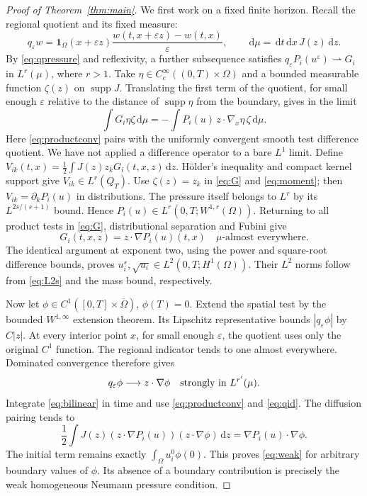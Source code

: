 \documentclass[11pt]{article}
\newcommand{\eps}{\varepsilon}
\newcommand{\dd}{\,\mathrm d}
\newcommand{\Om}{\Omega}
\newcommand{\qe}{q_\eps}
\DeclareMathOperator{\supp}{supp}
\begin{document}
\begin{proof}[Proof of Theorem~\ref{thm:main}]
We first work on a fixed finite horizon. Recall the regional quotient and its
fixed measure:
\[
 \qe w=\mathbf1_\Om(x+\eps z)
       \frac{w(t,x+\eps z)-w(t,x)}{\eps},\qquad
 \dd\mu=\dd t\dd x\,J(z)\dd z.
\]
By \eqref{eq:qpressure} and reflexivity, a further subsequence satisfies
$\qe P_i(u^\eps)\rightharpoonup G_i$ in $L^r(\mu)$, where $r>1$.
Take $\eta\in C_c^\infty((0,T)\times\Om)$ and a bounded measurable
function $\zeta(z)$ on $\supp J$. Translating the first term of the
quotient, for small enough $\eps$ relative to the distance of $\supp\eta$
from the boundary, gives in the limit
\begin{equation}\label{eq:G}
 \int G_i\eta\zeta\dd\mu
       =-\int P_i(u)\,z\cdot\nabla_x\eta\,\zeta\dd\mu.
\end{equation}
Here \eqref{eq:productconv} pairs with the uniformly convergent smooth test
difference quotient. We have not applied a difference operator to a bare
$L^1$ limit.
Define $V_{ik}(t,x)=\frac12\int J(z)z_kG_i(t,x,z)\dd z$.
H\"older's inequality and compact kernel support give $V_{ik}\in L^r(Q_T)$.
Use $\zeta(z)=z_k$ in \eqref{eq:G} and \eqref{eq:moment}; then
$V_{ik}=\partial_kP_i(u)$ in distributions. The pressure itself belongs
to $L^r$ by its $L^{2s/(s+1)}$ bound. Hence
$P_i(u)\in L^r(0,T;W^{1,r}(\Om))$.
Returning to all product tests in \eqref{eq:G}, distributional separation
and Fubini give
\begin{equation}\label{eq:qid}
 G_i(t,x,z)=z\cdot\nabla P_i(u)(t,x)\quad\mu\text{-almost everywhere}.
\end{equation}
The identical argument at exponent two, using the power and square-root
difference bounds, proves $u_i^s,\sqrt{u_i}\in L^2(0,T;H^1(\Om))$.
Their $L^2$ norms follow from \eqref{eq:L2s} and the mass bound, respectively.

Now let $\phi\in C^1([0,T]\times\overline\Om)$, $\phi(T)=0$.
Extend the spatial test by the bounded $W^{1,\infty}$ extension theorem.
Its Lipschitz representative bounds $|\qe\phi|$ by $C|z|$. At every
interior point $x$, for small enough $\eps$, the quotient uses only the
original $C^1$ function. The regional indicator tends to one almost
everywhere. Dominated convergence therefore gives
\[
 \qe\phi\longrightarrow z\cdot\nabla\phi
             \quad\hbox{strongly in }L^{r'}(\mu).
\]
Integrate \eqref{eq:bilinear} in time and use
\eqref{eq:productconv} and \eqref{eq:qid}. The diffusion pairing tends to
\[
 \frac12\int J(z)(z\cdot\nabla P_i(u))(z\cdot\nabla\phi)\dd z
                         =\nabla P_i(u)\cdot\nabla\phi.
\]
The initial term remains exactly $\int_\Om u_i^0\phi(0)$.
This proves \eqref{eq:weak} for arbitrary boundary values of $\phi$.
Its absence of a boundary contribution is precisely the weak homogeneous
Neumann pressure condition.


\end{proof}
\end{document}
